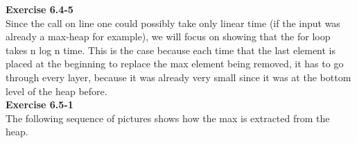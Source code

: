 \documentclass{article}
\begin{document}
\noindent\textbf{Exercise 6.4-5}\\

Since the call on line one could possibly take only linear time (if the input was already a max-heap for example), we will focus on showing that the for loop takes n log n time. This is the case because each time that the last element is placed at the beginning to replace the max element being removed, it has to go through every layer, because it was already very small since it was at the bottom level of the heap before.\\

\noindent\textbf{Exercise 6.5-1}\\


The following sequence of pictures shows how the max is extracted from the heap.
\end{document}
